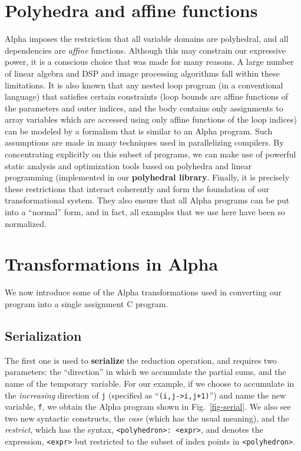 \section{Polyhedra and affine functions}
  Alpha imposes the restriction that all variable domains are polyhedral, and
all dependencies are {\em affine} functions.  Although this may constrain our
expressive power, it is a conscious choice that was made for many reasons.  A
large number of linear algebra and DSP and image processing algorithms fall
within these limitations.  It is also known 
that any
nested loop program (in a conventional language) that satisfies certain
constraints (loop bounds are affine functions of the parameters and outer
indices, and the body contains only assignments to array variables which are
accessed using only affine functions of the loop indices) can be modeled by a
formalism that is similar to an Alpha program.  Such assumptions are made in
many techniques used in parallelizing compilers.  By concentrating explicitly
on this subset of programs, we can make use of powerful static analysis and
optimization tools based on polyhedra and linear programming (implemented in
our {\bf polyhedral library}.
Finally, it is precisely
these restrictions that interact coherently and form the foundation of our
transformational system.  They also ensure that all Alpha programs can be put
into a ``normal'' form, and in fact, all examples that we use here have been
so normalized.

\section{Transformations in Alpha}

  We now introduce some of the Alpha transformations used in converting our
program into a single assignment C program.  
\subsection{Serialization}
The first one is used to {\bf
serialize} the reduction operation, and requires two parameters: the
``direction'' in which we accumulate the partial sums, and the name of the
temporary variable.  For our example, if we choose to accumulate in the {\em
increasing} direction of {\tt j} (specified as ``{\tt (i,j->i,j+1)}'') and
name the new variable, {\tt f}, we obtain the Alpha program shown in
Fig.~\ref{fig-serial}.  We also see two new syntactic constructs, the {\em
case} (which has the usual meaning), and the {\em restrict}, which has the
syntax,
 \verb!<polyhedron>: <expr>!, and denotes the expression, {\tt <expr>} but
restricted to the subset of index points in {\tt <polyhedron>}.

